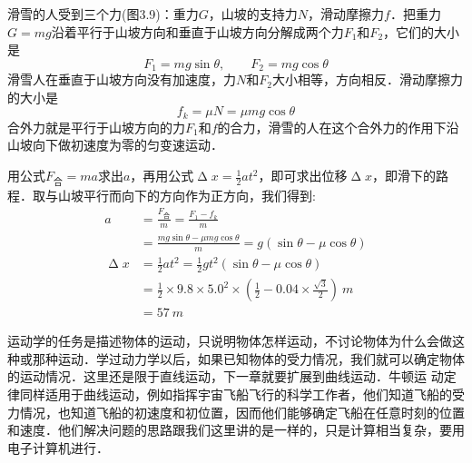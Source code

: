 \begin{solution}
    滑雪的人受到三个力(图3.9)：重力$G$，山坡的支持力$N$，滑动摩擦力$f$．把重力$G=mg$沿着平行于山坡方向和垂直于山坡方向分解成两个力$F_1$和$F_2$，它们的大小是
    \begin{equation*}
        F_1=mg\sin\theta ,\qquad  F_2=mg\cos\theta
    \end{equation*}
    滑雪人在垂直于山坡方向没有加速度，力$N$和$F_2$大小相等，方向相反．滑动摩擦力的大小是
    \[f_k=\mu N=\mu mg\cos\theta \]
    合外力就是平行于山坡方向的力$F_1$和$f$的合力，滑雪的人在这个合外力的作用下沿山坡向下做初速度为零的匀变速运动．

    用公式$F_{\text{合}}=ma$求出$a$，再用公式$\upDelta x=\frac{1}{2}at^2$，即可求出位移$\upDelta x$，即滑下的路程．取与山坡平行而向下的方向作为正方向，我们得到:
    \[\begin{split}
            a          & =\frac{F_{\text{合}}}{m}=\frac{F_1-f_k}{m}                                                               \\
                       & =\frac{mg\sin\theta-\mu mg\cos\theta }{m}=g(\sin\theta-\mu \cos\theta)                                  \\
            \upDelta x & =\frac{1}{2}at^2=\frac{1}{2}gt^2(\sin\theta-\mu \cos\theta)                                             \\
                       & =\frac{1}{2}\times 9.8\times 5.0^2\times \left( \frac{1}{2}-0.04\times \frac{\sqrt{3}}{2}\right)~\si{m} \\
                       & =\SI{57}{m}
        \end{split} \]
\end{solution}

运动学的任务是描述物体的运动，只说明物体怎样运动，不讨论物体为什么会做这种或那种运动．学过动力学以后，如果已知物体的受力情况，我们就可以确定物体的运动情况．这里还是限于直线运动，下一章就要扩展到曲线运动．牛顿运
动定律同样适用于曲线运动，例如指挥宇宙飞船飞行的科学工作者，他们知道飞船的受力情况，也知道飞船的初速度和初位置，因而他们能够确定飞船在任意时刻的位置和速度．他们解决问题的思路跟我们这里讲的是一样的，只是计算相当复杂，要用电子计算机进行．


